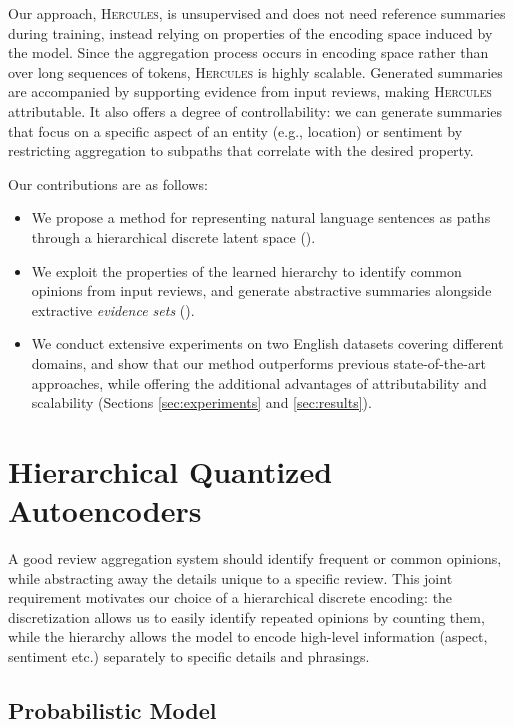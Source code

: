 \documentclass[11pt]{article}
\begin{document}
Our approach, \textsc{Hercules}, is unsupervised and does not need reference summaries during training, instead relying on properties of the encoding space induced by the model. Since the aggregation process occurs in encoding space rather than over long sequences of tokens, \textsc{Hercules} is highly scalable. Generated summaries are accompanied by supporting evidence from input reviews, making \textsc{Hercules} attributable. It also offers a degree of controllability: we can generate summaries that focus on a specific aspect of an entity (e.g., location) or sentiment by restricting aggregation to subpaths that correlate with the desired property.

Our contributions are as follows:
\begin{itemize}
\item We propose a method for representing natural language sentences as paths through a hierarchical discrete latent space ().
\item We exploit the properties of the learned hierarchy to identify common opinions from input reviews, and generate abstractive summaries alongside extractive \emph{evidence sets} ().
\item We conduct extensive experiments on two English datasets covering different domains, and show that our method outperforms previous state-of-the-art approaches, while offering the additional advantages of attributability and scalability (Sections \ref{sec:experiments} and \ref{sec:results}).
\end{itemize}

\section{Hierarchical Quantized Autoencoders}
\label{sec:hrqvae}

A good review aggregation system should identify frequent or common opinions, while abstracting away the details unique to a specific review. This joint requirement motivates our choice of a hierarchical discrete encoding: the discretization allows us to easily identify repeated opinions by counting them, while the hierarchy allows the model to encode high-level information (aspect, sentiment etc.) separately to specific details and phrasings.



\subsection{Probabilistic Model}
\end{document}
